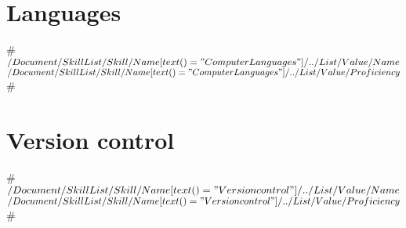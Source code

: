 \documentclass[11pt,a4paper,sans]{moderncv}
\begin{document}

\section{Languages}
#
{$/Document/SkillList/Skill/Name[text()="Computer Languages"]/../List/Value/Name$}
{$/Document/SkillList/Skill/Name[text()="Computer Languages"]/../List/Value/Proficiency$}
#

\section{Version control}
#
{$/Document/SkillList/Skill/Name[text()="Version control"]/../List/Value/Name$}
{$/Document/SkillList/Skill/Name[text()="Version control"]/../List/Value/Proficiency$}
#
\end{document}

